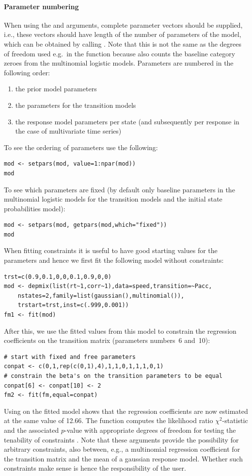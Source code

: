 \documentclass[article]{jss}
\begin{document}
\paragraph{Parameter numbering} When using the  and
 arguments, complete parameter vectors should be supplied,
i.e., these vectors should have length of the number of parameters of
the model, which can be obtained by calling . Note that
this is not the same as the degrees of freedom used e.g.\ in the 
function because  also counts the baseline category zeroes
from the multinomial logistic models. 
Parameters are numbered in the following order:
\begin{enumerate}
	\item  the prior model parameters
	\item  the parameters for the transition models
	\item  the response model parameters per state (and subsequently
	per response in the case of multivariate time series)
\end{enumerate}

To see the ordering of parameters use the following:
\begin{verbatim}
mod <- setpars(mod, value=1:npar(mod))
mod
\end{verbatim}

To see which parameters are fixed (by default only baseline parameters
in the multinomial logistic models for the transition models and the
initial state probabilities model):
\begin{verbatim}
mod <- setpars(mod, getpars(mod,which="fixed"))
mod
\end{verbatim}

When fitting constraints it is useful to have good starting values 
for the parameters and hence we first fit the following model without
constraints:
\begin{verbatim}
trst=c(0.9,0.1,0,0,0.1,0.9,0,0)
mod <- depmix(list(rt~1,corr~1),data=speed,transition=~Pacc,
	nstates=2,family=list(gaussian(),multinomial()),
	trstart=trst,inst=c(.999,0.001))
fm1 <- fit(mod)
\end{verbatim}
After this, we use the fitted values from this model to constrain the 
regression coefficients on the transition matrix (parameters numbers~6 and~10):
\begin{verbatim}
# start with fixed and free parameters
conpat <- c(0,1,rep(c(0,1),4),1,1,0,1,1,1,0,1)
# constrain the beta's on the transition parameters to be equal
conpat[6] <- conpat[10] <- 2
fm2 <- fit(fm,equal=conpat)
\end{verbatim}
Using  on the fitted model shows that the regression 
coefficients are now estimated at the same value of 12.66. The function
 computes the likelihood ratio $\chi^2$-statistic and the
associated $p$-value with appropriate degrees of freedom for testing the
tenability of constraints \citep{Dannemann2007}. Note that these arguments 
provide the possibility for arbitrary 
constraints, also between, e.g., a multinomial regression coefficient 
for the transition matrix and the mean of a gaussian response model. 
Whether such constraints make sense is hence the responsibility of 
the user. 
\end{document}
